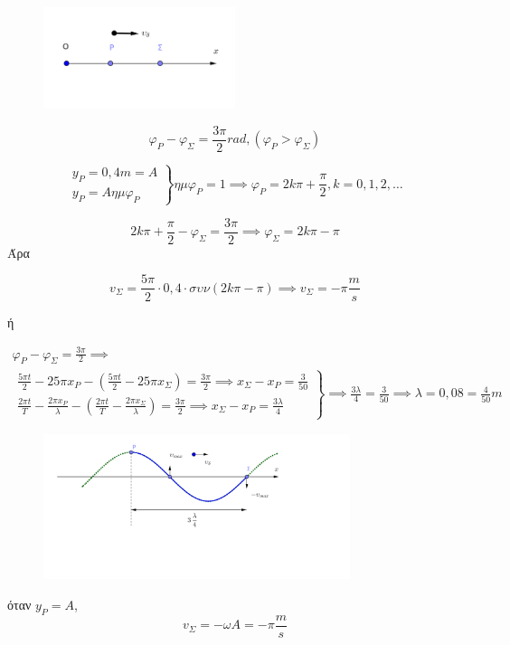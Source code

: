 \documentclass[12pt]{article}
\begin{document}
\begin{enumerate}
      \begin{figure}[h]
        \includegraphics[width=0.5\textwidth]{ΦυσικήΓ4.png}
        \centering
      \end{figure}

      $$φ_Ρ-φ_Σ=\frac{3\pi}{2}rad,(φ_Ρ>φ_Σ)$$

      $$\left. \begin{matrix}y_Ρ=0,4m=A \\ y_Ρ=Aημφ_Ρ\end{matrix} \right\} ημφ_Ρ=1\implies φ_Ρ=2k\pi+\frac{\pi}{2},k=0,1,2,\ldots$$

      $$2k\pi+\frac{\pi}{2}-φ_Σ=\frac{3\pi}{2}\implies φ_Σ=2k\pi-\pi$$
      Άρα

      $$v_Σ=\frac{5\pi}{2}\cdot 0,4\cdot συν\left(2k\pi-\pi\right)\implies v_Σ=-\pi \frac{m}{s}$$

      ή

      \begin{gather*}
        φ_Ρ-φ_Σ=\frac{3\pi}{2}\implies \\
        \left. \begin{matrix}\frac{5\pi t}{2}-25\pi x_Ρ-\left(\frac{5\pi t}{2}-25\pi x_Σ\right)=\frac{3\pi}{2}\implies x_Σ-x_Ρ=\frac{3}{50} \\ \frac{2\pi t}{T}-\frac{2\pi x_Ρ}{λ}-\left(\frac{2\pi t}{T}-\frac{2\pi x_Σ}{λ}\right)=\frac{3\pi}{2}\implies x_Σ-x_Ρ=\frac{3λ}{4}\end{matrix} \right\}\implies \frac{3λ}{4}=\frac{3}{50}\implies λ=0,08=\frac{4}{50}m
      \end{gather*}


      \begin{figure}[h]
        \includegraphics[width=0.8\textwidth]{ΦυσικήΓ4_2.png}
        \centering
      \end{figure}

      όταν $y_Ρ=A$, $$v_Σ=-ωA=-\pi \frac{m}{s}$$
  \end{enumerate}
\end{document}
